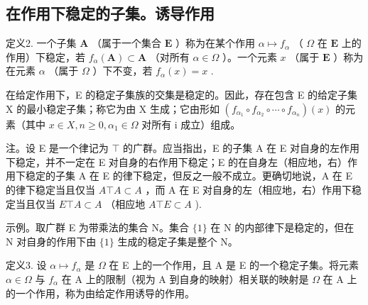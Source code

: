 \subsection{在作用下稳定的子集。诱导作用}

定义2. 一个子集 \(\mathbf{A}\) （属于一个集合 \(\mathbf{E}\) ）称为在某个作用 \(\alpha \mapsto f_{\alpha}\) （ \(\Omega\) 在 \(\mathbf{E}\) 上的作用）下稳定，若 \(f_{\alpha}(\mathbf{A}) \subset \mathbf{A}\) （对所有 \(\alpha \in \Omega\) ）。一个元素 \(x\) （属于 \(\mathbf{E}\) ）称为在元素 \(\alpha\) （属于 \(\Omega\) ）下不变，若 \(f_{\alpha}(x) = x\) .

在给定作用下，E 的稳定子集族的交集是稳定的。因此，存在包含 E 的给定子集 X 的最小稳定子集；称它为由 X 生成；它由形如 \((f_{\alpha_{1}} \circ f_{\alpha_{2}} \circ \cdots \circ f_{\alpha_{n}})(x)\) 的元素（其中 \(x \in X, n \geqslant 0, \alpha_{1} \in \Omega\) 对所有 i 成立）组成。

注。设 E 是一个律记为 \(\top\) 的广群。应当指出，E 的子集 A 在 E 对自身的左作用下稳定，并不一定在 E 对自身的右作用下稳定；E 的在自身左（相应地，右）作用下稳定的子集 A 在 E 的律下稳定，但反之一般不成立。更确切地说，A 在 E 的律下稳定当且仅当 \(A \top A \subset A\) ，而 A 在 E 对自身的左（相应地，右）作用下稳定当且仅当 \(E \top A \subset A\) （相应地 \(A \top E \subset A\) ).

示例。取广群 E 为带乘法的集合 N。集合 \(\{1\}\) 在 N 的内部律下是稳定的，但在 N 对自身的作用下由 \(\{1\}\) 生成的稳定子集是整个 N。

定义3. 设 \(\alpha \mapsto f_{\alpha}\) 是 \(\Omega\) 在 E 上的一个作用，且 A 是 E 的一个稳定子集。将元素 \(\alpha \in \Omega\) 与 \(f_{\alpha}\) 在 A 上的限制（视为 A 到自身的映射）相关联的映射是 \(\Omega\) 在 A 上的一个作用，称为由给定作用诱导的作用。

